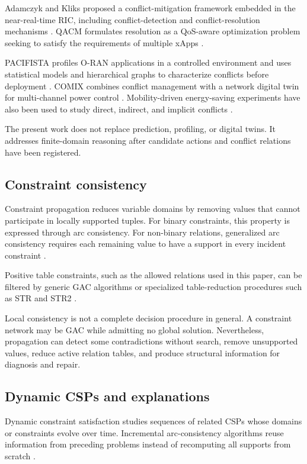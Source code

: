 \documentclass[pdflatex,sn-mathphys-num,iicol,oneside]{sn-jnl}
\begin{document}
Adamczyk and Kliks proposed a conflict-mitigation framework embedded
in the near-real-time RIC, including conflict-detection and
conflict-resolution mechanisms \cite{adamczyk2023conflict}. QACM
formulates resolution as a QoS-aware optimization problem seeking to
satisfy the requirements of multiple xApps \cite{wadud2024qacm}.

PACIFISTA profiles O-RAN applications in a controlled environment and
uses statistical models and hierarchical graphs to characterize
conflicts before deployment \cite{prever2025pacifista}. COMIX
combines conflict management with a network digital twin for
multi-channel power control \cite{giannopoulos2025comix}.
Mobility-driven energy-saving experiments have also been used to
study direct, indirect, and implicit conflicts
\cite{wadud2025mobility}.

The present work does not replace prediction, profiling, or digital
twins. It addresses finite-domain reasoning after candidate actions
and conflict relations have been registered.

\subsection{Constraint consistency}

Constraint propagation reduces variable domains by removing values
that cannot participate in locally supported tuples. For binary
constraints, this property is expressed through arc consistency.
For non-binary relations, generalized arc consistency requires each
remaining value to have a support in every incident constraint
\cite{yap2020gac}.

Positive table constraints, such as the allowed relations used in
this paper, can be filtered by generic GAC algorithms or specialized
table-reduction procedures such as STR and STR2
\cite{lecoutre2011str2}.

Local consistency is not a complete decision procedure in general.
A constraint network may be GAC while admitting no global solution.
Nevertheless, propagation can detect some contradictions without
search, remove unsupported values, reduce active relation tables, and
produce structural information for diagnosis and repair.

\subsection{Dynamic CSPs and explanations}

Dynamic constraint satisfaction studies sequences of related CSPs
whose domains or constraints evolve over time. Incremental
arc-consistency algorithms reuse information from preceding problems
instead of recomputing all supports from scratch
\cite{bessiere1991dynamic}.
\end{document}
